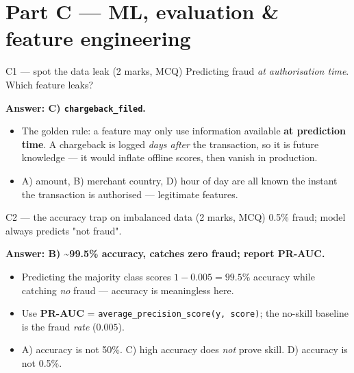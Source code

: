 \documentclass[aspectratio=169,11pt]{beamer}
\begin{document}
\section{Part C --- ML, evaluation \& feature engineering}

\begin{frame}[fragile]{C1 --- spot the data leak \hfill (2 marks, MCQ)}
Predicting fraud \emph{at authorisation time}. Which feature leaks?
\medskip

\textbf{Answer: C) \textcolor{cgreen}{\texttt{chargeback\_filed}}.}
\begin{itemize}
  \item The golden rule: a feature may only use information available \textbf{at prediction time}. A chargeback is logged \emph{days after} the transaction, so it is future knowledge --- it would inflate offline scores, then vanish in production.
  \item A) amount, B) merchant country, D) hour of day are all known the instant the transaction is authorised --- legitimate features.
\end{itemize}
\end{frame}

\begin{frame}[fragile]{C2 --- the accuracy trap on imbalanced data \hfill (2 marks, MCQ)}
0.5\% fraud; model always predicts "not fraud".
\medskip

\textbf{Answer: B) \textcolor{cgreen}{\textasciitilde99.5\% accuracy, catches zero fraud; report PR-AUC}.}
\begin{itemize}
  \item Predicting the majority class scores $1-0.005 = 99.5\%$ accuracy while catching \emph{no} fraud --- accuracy is meaningless here.
  \item Use \textbf{PR-AUC} = \texttt{average\_precision\_score(y, score)}; the no-skill baseline is the fraud \emph{rate} ($0.005$).
  \item A) accuracy is not 50\%. C) high accuracy does \emph{not} prove skill. D) accuracy is not 0.5\%.
\end{itemize}
\end{frame}
\end{document}

